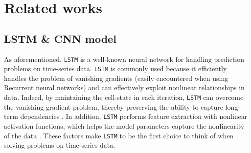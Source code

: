 \documentclass[aps,prb,groupedaddress,twocolumn,showpacs,dvipdfmx,superscriptaddress,pdftex]{revtex4-2}
\begin{document}
\section{Related works}
\label{sec.relatedWork}

\subsection{LSTM \& CNN model}


As aforementioned, \verb|LSTM| is a well-known neural network for handling prediction problems on time-series data. \verb|LSTM| is commonly used because it efficiently handles the problem of vanishing gradients (easily encountered when using Recurrent neural networks) and can effectively exploit nonlinear relationships in data. Indeed, by maintaining the cell-state in each iteration, \verb|LSTM| can overcome the vanishing gradient problem, thereby preserving the ability to capture long-term dependencies \cite{cheng2018applied}. In addition, \verb|LSTM| performs feature extraction with nonlinear activation functions, which helps the model parameters capture the nonlinearity of the data \cite{he2016exploiting}. These factors make \verb|LSTM| to be the first choice to think of when solving problems on time-series data.

\vspace{2mm}

\end{document}
